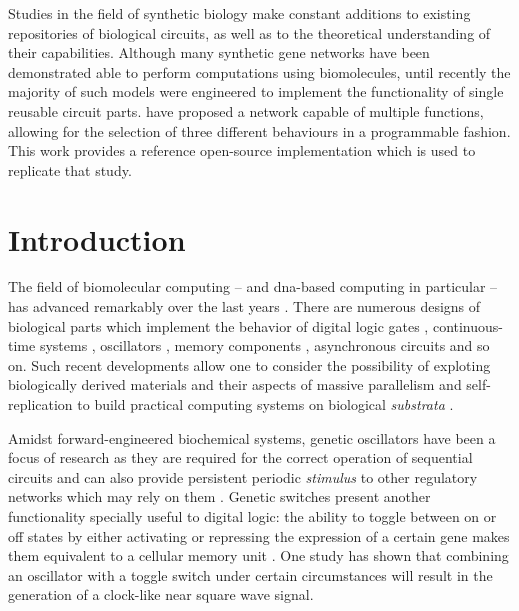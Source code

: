 
  \noindent Studies in the field of synthetic biology make constant additions to existing repositories of biological circuits, as well as to the theoretical understanding of their capabilities.
  Although many synthetic gene networks have been demonstrated able to perform computations using biomolecules, until recently the majority of such models were engineered to implement the functionality of single reusable circuit parts.
  \citet{originals} have proposed a network capable of multiple functions, allowing for the selection of three different behaviours in a programmable fashion.
  This work provides a reference open-source implementation which is used to replicate that study.


\section{Introduction}

  The field of biomolecular computing -- and \acs{dna}-based computing in particular -- has advanced remarkably over the last years \cite{analog}.
  There are numerous designs of biological parts which implement the behavior of digital logic gates \supercite{async}, continuous-time systems \supercite{analog}, oscillators \supercite{repressilator}, memory components \supercite{async}, asynchronous circuits \supercite{async} and so on.
  Such recent developments allow one to consider the possibility of exploting biologically derived materials and their aspects of massive parallelism and self-replication to build practical computing systems on biological \textit{substrata} \cite{youtuber}.

  Amidst forward-engineered biochemical systems, genetic oscillators have been a focus of research as they are required for the correct operation of sequential circuits and can also provide persistent periodic \textit{stimulus} to other regulatory networks which may rely on them \cite{ingalls}.
  Genetic switches present another functionality specially useful to digital logic: the ability to toggle between on or off states by either activating or repressing the expression of a certain gene makes them equivalent to a cellular memory unit \cite{youtuber}.
  One study\supercite{clock} has shown that combining an oscillator with a toggle switch under certain circumstances will result in the generation of a clock-like near square wave signal.

